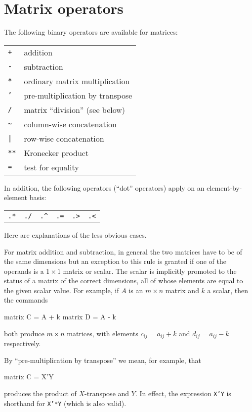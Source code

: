 \section{Matrix operators}
\label{matrix-op}

The following binary operators are available for matrices:

\begin{center}
\begin{tabular}{ll}
\texttt{+}  & addition \\
\texttt{-}  & subtraction \\
\texttt{*}  & ordinary matrix multiplication \\
\texttt{'}  & pre-multiplication by transpose \\
\texttt{/}  & matrix ``division'' (see below) \\
\verb+~+    & column-wise concatenation \\
\verb+|+    & row-wise concatenation \\
\texttt{**} & Kronecker product \\
\texttt{=}  & test for equality 
\end{tabular}
\end{center}

In addition, the following operators (``dot'' operators) apply on an
element-by-element basis:

\begin{center}
\begin{tabular}{cccccc}
\texttt{.*}  &  \texttt{./}  &  \verb+.^+  &
\texttt{.=}  &  \texttt{.>}  &  \texttt{.<} 
\end{tabular}
\end{center}

Here are explanations of the less obvious cases. 

For matrix addition and subtraction, in general the two matrices have
to be of the same dimensions but an exception to this rule is granted
if one of the operands is a $1\times 1$ matrix or scalar.  The scalar
is implicitly promoted to the status of a matrix of the correct
dimensions, all of whose elements are equal to the given scalar value.
For example, if $A$ is an $m \times n$ matrix and $k$ a scalar, then
the commands
%
\begin{code}
matrix C = A + k
matrix D = A - k
\end{code}
%
both produce $m \times n$ matrices, with elements $c_{ij} = 
a_{ij} + k$ and $d_{ij} = a_{ij} - k$ respectively.

By ``pre-multiplication by transpose'' we mean, for example, that 
%
\begin{code}
matrix C = X'Y
\end{code}
%
produces the product of $X$-transpose and $Y$.  In effect, 
the expression \texttt{X'Y} is shorthand for \texttt{X'*Y}
(which is also valid).

